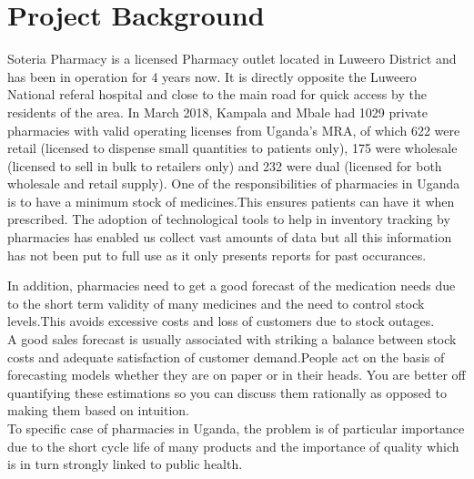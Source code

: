 \documentclass[12pt]{report}
\begin{document}
\section{Project Background}
Soteria Pharmacy is a licensed Pharmacy outlet located in Luweero District and has been in operation for 4 years now. It is directly opposite the Luweero National referal hospital and close to the main road for quick access by the residents of the area.
In March 2018, Kampala and Mbale had 1029 private pharmacies with valid operating licenses from Uganda’s MRA, of which 622 were retail (licensed to dispense small quantities to patients only), 175 were wholesale (licensed to sell in bulk to retailers only) and 232 were dual (licensed for both wholesale and retail supply).\cite{14}
One of the responsibilities of pharmacies in  Uganda is to have a minimum stock of medicines.This ensures patients can have it when prescribed.
The adoption of technological tools to help in inventory tracking by pharmacies has enabled us collect vast amounts of data but all this information has not been put to full use as it only presents reports for past occurances.

In addition, pharmacies need to get a good forecast of the medication needs due to the short term validity of many medicines and the need to control stock levels.This avoids excessive costs and loss of customers due to stock outages.\\

A good sales forecast is usually associated with striking a balance between stock costs and adequate satisfaction of customer demand.People act on the basis of forecasting models whether they are on paper or in their heads. You are better off quantifying these estimations so you can discuss them rationally as opposed to making them based on intuition.\\

To specific case of pharmacies in Uganda, the problem is of particular importance due to the short cycle life of many products and the importance of quality which is in turn strongly linked to public health.

\end{document}
